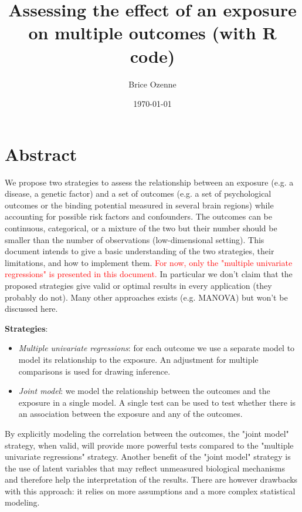 \documentclass{article}
\author{Brice Ozenne}
\date{\today}
\title{Assessing the effect of an exposure on multiple outcomes (with R code)}
\begin{document}
\maketitle

\section*{Abstract}
\label{sec:org1657a8b}
We propose two strategies to assess the relationship between an
exposure (e.g. a disease, a genetic factor) and a set of outcomes
(e.g. a set of psychological outcomes or the binding potential
measured in several brain regions) while accounting for possible risk
factors and confounders. The outcomes can be continuous, categorical,
or a mixture of the two but their number should be smaller than the
number of observations (low-dimensional setting). This document
intends to give a basic understanding of the two strategies, their
limitations, and how to implement them. \textcolor{red}{For
now, only the "multiple univariate regressions" is presented in this
document.} In particular we don't claim that the proposed strategies
give valid or optimal results in every application (they probably do
not). Many other approaches exists (e.g. MANOVA) but won't be
discussed here.

\bigskip

\textbf{Strategies}: 
\begin{itemize}
\item \emph{Multiple univariate regressions}: for each outcome we use a
separate model to model its relationship to the exposure. An
adjustment for multiple comparisons is used for drawing inference.
\item \emph{Joint model}: we model the relationship between the outcomes and
the exposure in a single model. A single test can be used to test
whether there is an association between the exposure and any of the
outcomes.
\end{itemize}
By explicitly modeling the correlation between the outcomes, the
"joint model" strategy, when valid, will provide more powerful tests
compared to the "multiple univariate regressions" strategy. Another
benefit of the "joint model" strategy is the use of latent variables
that may reflect unmeasured biological mechanisms and therefore help
the interpretation of the results. There are however drawbacks with
this approach: it relies on more assumptions and a more complex
statistical modeling. 

\bigskip
\end{document}
